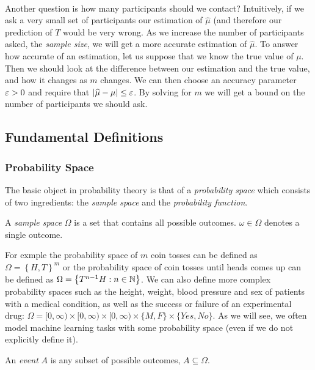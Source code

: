 ~\\Another question is how many participants should we contact? Intuitively, if we ask a very small set of participants our estimation of $\widehat{\mu}$ (and therefore our prediction of $T$ would be very wrong. As we increase the number of participants asked, the \textit{sample size}, we will get a more accurate estimation of $\widehat{\mu}$. To answer how accurate of an estimation, let us suppose that we know the true value of $\mu$. Then we should look at the difference between our estimation and the true value, and how it changes as $m$ changes. We can then choose an accuracy parameter $\varepsilon > 0$ and require that $\left|\widehat{\mu} - \mu\right|\leq \varepsilon$. By solving for $m$ we will get a bound on the number of participants we should ask.


\subsection{Fundamental Definitions}
\subsubsection{Probability Space}
The basic object in probability theory is that of a \emph{probability space} which consists of two ingredients: the \textit{sample space} and the \textit{probability function}.
\begin{definition}
A \textit{sample space} $\Omega$ is a set that contains all possible outcomes. $\omega\in\Omega$ denotes a single outcome.
\end{definition}

For exmple the probability space of $m$ coin tosses can be defined as $\Omega=\left\{ H,T\right\}^m $ or the probability space of coin tosses until heads comes up can be defined as $\Omega=\left\{ T^{n-1}H:n\in\mathbb{N}\right\} $. We can also define more complex probability spaces such as the height, weight, blood pressure and sex of patients with a medical condition, as well as the success or failure of an experimental drug: $\Omega=[0,\infty)\times [0,\infty) \times[0,\infty) \times \{M,F\}\times \{Yes,No\} $. As we will see, we often model machine learning tasks with some probability space (even if we do not explicitly define it).

\begin{definition}
An \textit{event} $A$ is any subset of possible outcomes, $A\subseteq\Omega$.
\end{definition}

